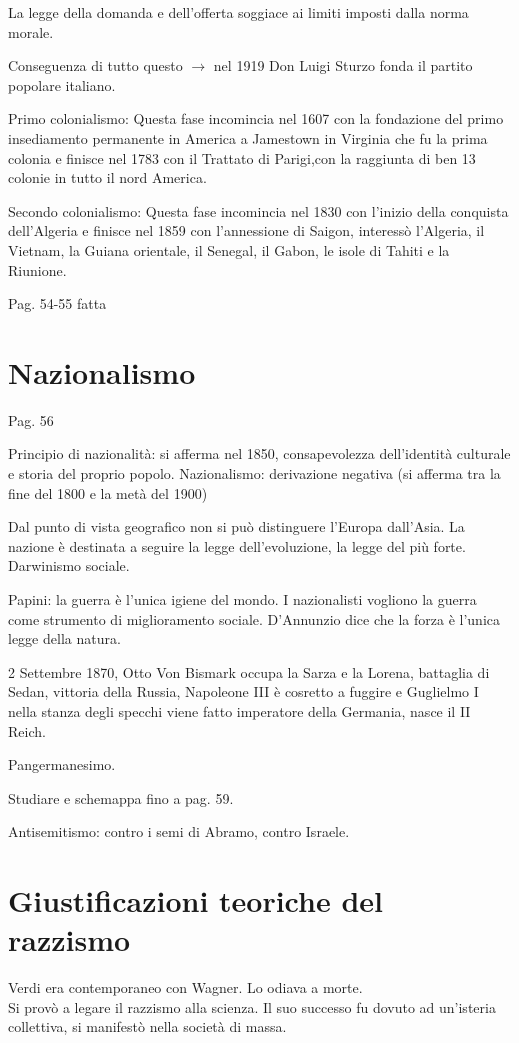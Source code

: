 \documentclass{article}
\begin{document}
    La legge della domanda e dell'offerta soggiace ai limiti imposti dalla norma morale.

    Conseguenza di tutto questo $\rightarrow$ nel 1919 Don Luigi Sturzo fonda il partito popolare italiano.

    Primo colonialismo:
    Questa fase incomincia nel 1607 con la fondazione del primo insediamento permanente in America a Jamestown in Virginia che fu la prima colonia e finisce nel 1783 con il Trattato di Parigi,con la raggiunta di ben 13 colonie in tutto il nord America.

    Secondo colonialismo:
    Questa fase incomincia nel 1830 con l'inizio della conquista dell'Algeria e finisce nel 1859 con l'annessione di Saigon, interessò l'Algeria, il Vietnam, la Guiana orientale, il Senegal, il Gabon, le isole di Tahiti e la Riunione.

    Pag. 54-55 fatta
    
    \section{Nazionalismo}
    Pag. 56

    Principio di nazionalità: si afferma nel 1850, consapevolezza dell'identità culturale e storia del proprio popolo.
    Nazionalismo: derivazione negativa (si afferma tra la fine del 1800 e la metà del 1900)

    Dal punto di vista geografico non si può distinguere l'Europa dall'Asia.
    La nazione è destinata a seguire la legge dell'evoluzione, la legge del più forte. Darwinismo sociale.

    Papini: la guerra è l'unica igiene del mondo. I nazionalisti vogliono la guerra come strumento di miglioramento sociale. D'Annunzio dice che la forza è l'unica legge della natura.

    2 Settembre 1870, Otto Von Bismark occupa la Sarza e la Lorena, battaglia di Sedan, vittoria della Russia, Napoleone III è cosretto a fuggire e Guglielmo I nella stanza degli specchi viene fatto imperatore della Germania, nasce il II Reich.

    Pangermanesimo.

    Studiare e schemappa fino a pag. 59.

    Antisemitismo: contro i semi di Abramo, contro Israele.
    
    \section{Giustificazioni teoriche del razzismo}
    Verdi era contemporaneo con Wagner. Lo odiava a morte.\\
    Si provò a legare il razzismo alla scienza. Il suo successo fu dovuto ad un'isteria collettiva, si manifestò nella società di massa.
\end{document}
